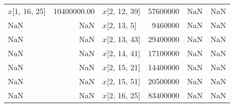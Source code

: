 \begin{longtable}{lrlrlr}
$x$[1, 16, 25] & 10400000.00 & $x$[2, 12, 39] & 57600000 & NaN & NaN \\
NaN & NaN & $x$[2, 13, 5] & 9460000 & NaN & NaN \\
NaN & NaN & $x$[2, 13, 43] & 29400000 & NaN & NaN \\
NaN & NaN & $x$[2, 14, 41] & 17100000 & NaN & NaN \\
NaN & NaN & $x$[2, 15, 21] & 14400000 & NaN & NaN \\
NaN & NaN & $x$[2, 15, 51] & 20500000 & NaN & NaN \\
NaN & NaN & $x$[2, 16, 25] & 83400000 & NaN & NaN \\
\end{longtable}
